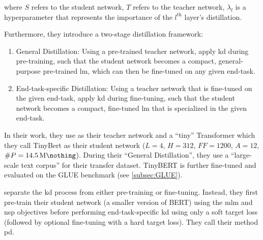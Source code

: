 where $S$ refers to the student network, $T$ refers to the teacher network, $\lambda_l$ is a hyperparameter that represents the importance of the $l^{\text{th}}$ layer's distillation.

Furthermore, they introduce a two-stage distillation framework:
\begin{enumerate}
    \item General Distillation: Using a pre-trained teacher network, apply \gls{kd} during pre-training, such that the student network becomes a compact, general-purpose pre-trained \gls{lm}, which can then be fine-tuned on any given end-task.
    \item End-task-specific Distillation: Using a teacher network that is fine-tuned on the given end-task, apply \gls{kd} during fine-tuning, such that the student network becomes a compact, fine-tuned \gls{lm} that is specialized in the given end-task.
\end{enumerate}

In their work, they use \bertbase as their teacher network and a ``tiny'' Transformer which they call TinyBert as their student network ($L=4$, $H=312$, $FF = 1200$,  $A=12$, $\#P=\SI{14.5}{\mega\nothing}$). During their ``General Distillation'', they use a ``large-scale text corpus'' for their transfer dataset. TinyBERT is further fine-tuned and evaluated on the GLUE benchmark (see \cref{subsec:GLUE}).

\citet{turc2019well} separate the \gls{kd} process from either pre-training or fine-tuning. Instead, they first pre-train their student network (a smaller version of BERT) using the \gls{mlm} and \gls{nsp} objectives before performing end-task-specific \gls{kd} using only a soft target loss (followed by optional fine-tuning with a hard target loss). They call their method \gls{pd}.

